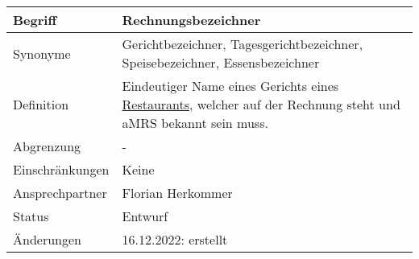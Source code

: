 \begin{table}[H]
    \centering
    \label{gls:Rechnungsbezeichner}
    \begin{tabularx}{\textwidth}{| l | X |}
        \hline
        Begriff         & Rechnungsbezeichner                                                                                                                      \\
        \hline
        Synonyme        & Gerichtbezeichner, Tagesgerichtbezeichner, Speisebezeichner, Essensbezeichner                                                            \\
        \hline
        Definition      & Eindeutiger Name eines Gerichts eines \hyperref[gls:restaurant]{Restaurants}, welcher auf der Rechnung steht und aMRS bekannt sein muss. \\
        \hline
        Abgrenzung      & -                                                                                                                                        \\
        \hline
        Einschränkungen & Keine                                                                                                                                    \\
        \hline
        Ansprechpartner & Florian Herkommer                                                                                                                        \\
        \hline
        Status          & Entwurf                                                                                                                                  \\
        \hline
        Änderungen      & 16.12.2022: erstellt                                                                                                                     \\
        \hline
    \end{tabularx}
\end{table}

